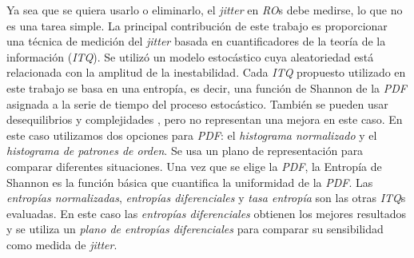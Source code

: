 Ya sea que se quiera usarlo o eliminarlo, el \textit{jitter} en \emph{RO}s debe medirse, lo que no es una tarea simple.
La principal contribución de este trabajo es proporcionar una técnica de medición del \textit{jitter} basada en cuantificadores de la teoría de la información (\emph{ITQ}).
Se utilizó un modelo estocástico cuya aleatoriedad está relacionada con la amplitud de la inestabilidad.
Cada \emph{ITQ} propuesto utilizado en este trabajo se basa en una entropía, es decir, una función de Shannon de la \emph{PDF} asignada a la serie de tiempo del proceso estocástico.
También se pueden usar desequilibrios y complejidades \cite{Amigo2005,Rosso2007B}, pero no representan una mejora en este caso.
En este caso utilizamos dos opciones para \emph{PDF}: el \emph{histograma normalizado} y el \emph{histograma de patrones de orden}.
Se usa un plano de representación para comparar diferentes situaciones.
Una vez que se elige la \emph{PDF}, la Entropía de Shannon es la función básica que cuantifica la uniformidad de la \emph{PDF}.
Las \emph{entropías normalizadas}, \emph{entropías diferenciales} y \emph{tasa entropía} son las otras \emph{ITQ}s evaluadas.
En este caso las \emph{entropías diferenciales} obtienen los mejores resultados y se utiliza un \emph{plano de entropías diferenciales} para comparar su sensibilidad como medida de \textit{jitter}.